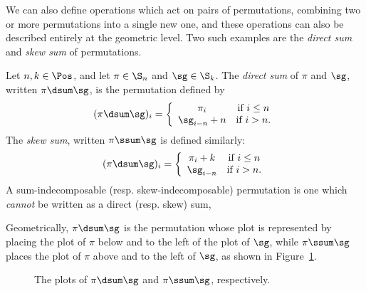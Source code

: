 \documentclass[12pt,twoside]{memoir}
\begin{document}
      
      We can also define operations which act on pairs of permutations, combining
      two or more permutations into a single new one, and these operations can
      also be described entirely at the geometric level.  Two such examples are
      the \emph{direct sum} and \emph{skew sum} of permutations. 

      \begin{definition} \label{prelim:def:sums}
        Let $n,k \in \Pos$, and let $\pi \in \S_n$ and $\sg \in \S_k$. The
        \emph{direct sum} of $\pi$ and $\sg$, written $\pi \dsum \sg$, is the
        permutation defined by 
        $$ (\pi \dsum \sg)_i = 
            \left\{ \begin{array}{cc} 
              \pi_i & \text{if} \ i \leq n \\
              \sg_{i-n} + n & \text{if} \ i > n. 
              \end{array} \right. $$
        The \emph{skew sum}, written $\pi \ssum \sg$ is defined similarly:
        $$ (\pi \dsum \sg)_i = 
            \left\{ \begin{array}{cc} 
              \pi_i + k & \text{if} \ i \leq n \\
              \sg_{i-n} & \text{if} \ i > n. 
              \end{array} \right. $$
        A sum-indecomposable (resp. skew-indecomposable) permutation is one which
        \emph{cannot} be written as a direct (resp. skew) sum,
      \end{definition}
      

      Geometrically, $\pi \dsum \sg$ is the permutation whose plot is represented
      by placing the plot of $\pi$ below and to the left of the plot of $\sg$,
      while $\pi \ssum \sg$ places the plot of $\pi$ above and to the left of
      $\sg$, as shown in Figure~\ref{prelim:fig:sums}.  

      \begin{figure}[t] \centering
        \hspace{4pc}

        \caption{The plots of $\pi \dsum \sg$ and $\pi \ssum \sg$, respectively.}
        \label{prelim:fig:sums}
      \end{figure}
\end{document}
